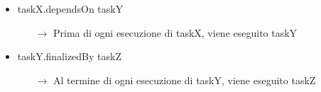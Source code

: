 \begin{itemize}
	\item taskX.dependsOn taskY
		\begin{itemize}
			\item[$\rightarrow$] Prima di ogni esecuzione di taskX, viene eseguito taskY
		\end{itemize}
	\item taskY.finalizedBy taskZ
		\begin{itemize}
			\item[$\rightarrow$] Al termine di ogni esecuzione di taskY, viene eseguito taskZ
		\end{itemize}
\end{itemize}
